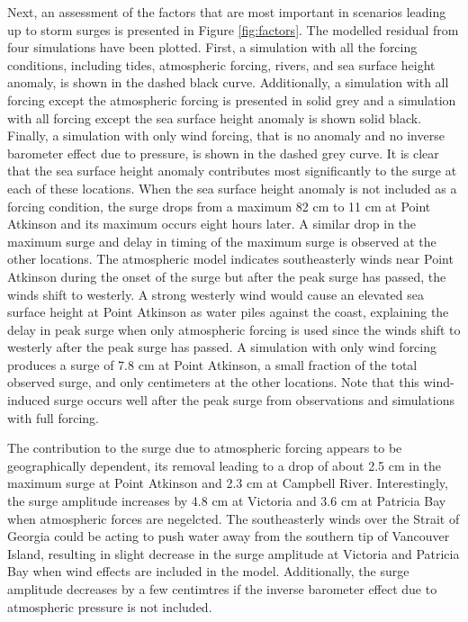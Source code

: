\documentclass[pdftex,10pt]{article}
\begin{document}
Next, an assessment of the factors that are most important in scenarios leading up to storm surges is presented in Figure \ref{fig:factors}. The modelled residual from four simulations have been plotted. First, a simulation with all the forcing conditions, including tides, atmospheric forcing, rivers, and sea surface height anomaly, is shown in the dashed black curve. Additionally, a simulation with all forcing except the atmospheric forcing is presented in solid grey and a simulation with all forcing except the sea surface height anomaly is shown solid black. Finally, a simulation with only wind forcing, that is no anomaly and no inverse barometer effect due to pressure, is shown in the dashed grey curve. It is clear that the sea surface height anomaly contributes most significantly to the surge at each of these locations. When the sea surface height anomaly is not included as a forcing condition, the surge drops from a maximum 82 cm to 11 cm at Point Atkinson and its maximum occurs eight hours later.  A similar drop in the maximum surge and delay in timing of the maximum surge is observed at the other locations. The atmospheric model indicates southeasterly winds near Point Atkinson during the onset of the surge but after the peak surge has passed, the winds shift to westerly. A strong westerly wind would cause an elevated sea surface height at Point Atkinson as water piles against the coast, explaining the delay in peak surge when only atmospheric forcing is used since the winds shift to westerly after the peak surge has passed. A simulation with only wind forcing produces a surge of 7.8 cm at Point Atkinson, a small fraction of the total observed surge, and only centimeters at the other locations. Note that this wind-induced surge occurs well after the peak surge from observations and simulations with full forcing.

The contribution to the surge due to atmospheric forcing appears to be geographically dependent, its removal leading to a drop of about 2.5 cm in the maximum surge at Point Atkinson and 2.3 cm at Campbell River. Interestingly, the surge amplitude increases by 4.8 cm at Victoria and 3.6 cm at Patricia Bay when atmospheric forces are negelcted. The southeasterly winds over the Strait of Georgia could be acting to push water away from the southern tip of Vancouver Island, resulting in slight decrease in the surge amplitude at Victoria and Patricia Bay when wind effects are included in the model. Additionally, the surge amplitude decreases by a few centimtres if the inverse barometer effect due to atmospheric pressure is not included. 
\end{document}
